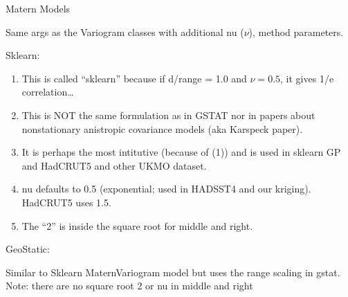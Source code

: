 \documentclass[letterpaper,10pt,english]{sphinxmanual}
\begin{document}
\begin{fulllineitems}
\label{\detokenize{covariance:glomar_gridding.variogram.MaternVariogram}}
\pysigstartsignatures
\pysiglinewithargsret
{}
{\sphinxparamcomma {}\sphinxparamcomma {}\sphinxparamcomma {}\sphinxparamcomma {}\sphinxparamcomma {}}
{}
\pysigstopsignatures
\sphinxAtStartPar
Matern Models

\sphinxAtStartPar
Same args as the Variogram classes with additional nu (\(\nu\)), method
parameters.

\sphinxAtStartPar
Sklearn:
\begin{enumerate}
%
\item {}
\sphinxAtStartPar
This is called “sklearn” because if d/range = 1.0 and \(\nu=0.5\), it
gives 1/e correlation…

\item {}
\sphinxAtStartPar
This is NOT the same formulation as in GSTAT nor in papers about
non\sphinxhyphen{}stationary anistropic covariance models (aka Karspeck paper).

\item {}
\sphinxAtStartPar
It is perhaps the most intitutive (because of (1)) and is used in sklearn
GP and HadCRUT5 and other UKMO dataset.

\item {}
\sphinxAtStartPar
nu defaults to 0.5 (exponential; used in HADSST4 and our kriging).
HadCRUT5 uses 1.5.

\item {}
\sphinxAtStartPar
The “2” is inside the square root for middle and right.

\end{enumerate}

\sphinxAtStartPar
GeoStatic:

\sphinxAtStartPar
Similar to Sklearn MaternVariogram model but uses the range scaling in
gstat.
Note: there are no square root 2 or nu in middle and right


\end{fulllineitems}
\end{document}
